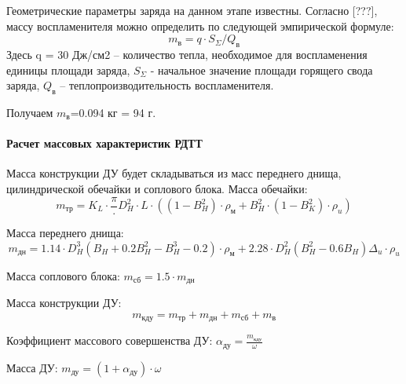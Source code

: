 Геометрические параметры заряда на данном этапе известны. Согласно [???], массу воспламенителя можно определить по следующей эмпирической формуле:
$$m_\text{в}=q \cdot S_\Sigma/Q_\text{в} $$
Здесь q = 30 Дж/см2 – количество тепла, необходимое для воспламенения единицы площади заряда, 
$S_\Sigma$ - начальное значение площади горящего свода заряда, 
$Q_\text{в}$ – теплопроизводительность воспламенителя.

Получаем $m_\text{в}$=0.094 кг = 94 г.

\clearpage
\paragraph{Расчет массовых характеристик РДТТ}

 Масса конструкции ДУ будет складываться из масс переднего днища, цилиндрической обечайки и соплового блока.
 Масса обечайки:
 $$m_\text{тр}=K_L \cdot \dfrac{\pi} \cdot D_H^2 \cdot L \cdot \left((1- B_H^2 ) \cdot \rho_\text{м}+ B_H^2 \cdot (1- B_K^2 ) \cdot \rho_u \right)$$

 Масса переднего днища:
 $$m_\text{дн}=1.14 \cdot  D_H ^3 (B_H+0.2B_H^2- B_H ^3-0.2) \cdot \rho_\text{м}+2.28 \cdot  D_H ^2 (B_H^2-0.6B_H)\Delta _u \cdot \rho_u$$

 Масса соплового блока:			$	m_\text{сб}=1.5 \cdot m_\text{дн}$

 Масса конструкции ДУ:				
 $$m_\text{кду}=m_\text{тр}+m_\text{дн}+m_\text{сб}+ m_\text{в}$$

 Коэффициент массового совершенства ДУ:		$\alpha_\text{ду}=\frac{m_\text{кду}}{\omega}$

 Масса ДУ:					$	m_\text{ду}=(1+\alpha_\text{ду}) \cdot  \omega $

